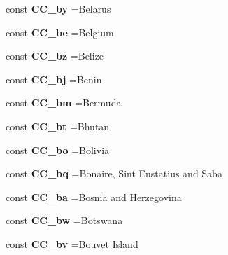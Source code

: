 \begin{DoxyCompactItemize}
const {\bfseries C\+C\+\_\+by} =\textquotesingle{}Belarus\textquotesingle{}
\item 
\hypertarget{class_i_s_o_a37e3e4c86d8a48574833899497b14cec}{}\label{class_i_s_o_a37e3e4c86d8a48574833899497b14cec} 
const {\bfseries C\+C\+\_\+be} =\textquotesingle{}Belgium\textquotesingle{}
\item 
\hypertarget{class_i_s_o_acffaaa157ec8a86e9ac82ad657552a5f}{}\label{class_i_s_o_acffaaa157ec8a86e9ac82ad657552a5f} 
const {\bfseries C\+C\+\_\+bz} =\textquotesingle{}Belize\textquotesingle{}
\item 
\hypertarget{class_i_s_o_aa577cece1733a86a1e013095b94c7e96}{}\label{class_i_s_o_aa577cece1733a86a1e013095b94c7e96} 
const {\bfseries C\+C\+\_\+bj} =\textquotesingle{}Benin\textquotesingle{}
\item 
\hypertarget{class_i_s_o_a4dc1d37b66e0ff75d1a1d0995ffadb3b}{}\label{class_i_s_o_a4dc1d37b66e0ff75d1a1d0995ffadb3b} 
const {\bfseries C\+C\+\_\+bm} =\textquotesingle{}Bermuda\textquotesingle{}
\item 
\hypertarget{class_i_s_o_a5daf301b5d449cbc01c064873382e600}{}\label{class_i_s_o_a5daf301b5d449cbc01c064873382e600} 
const {\bfseries C\+C\+\_\+bt} =\textquotesingle{}Bhutan\textquotesingle{}
\item 
\hypertarget{class_i_s_o_a92393ac5e7aac27c1fd4158d5d0d1832}{}\label{class_i_s_o_a92393ac5e7aac27c1fd4158d5d0d1832} 
const {\bfseries C\+C\+\_\+bo} =\textquotesingle{}Bolivia\textquotesingle{}
\item 
\hypertarget{class_i_s_o_ae092ddfc96ee8c9b41247a7b2e023597}{}\label{class_i_s_o_ae092ddfc96ee8c9b41247a7b2e023597} 
const {\bfseries C\+C\+\_\+bq} =\textquotesingle{}Bonaire, Sint Eustatius and Saba\textquotesingle{}
\item 
\hypertarget{class_i_s_o_a20aa41a46ef319522bad220e6e998db5}{}\label{class_i_s_o_a20aa41a46ef319522bad220e6e998db5} 
const {\bfseries C\+C\+\_\+ba} =\textquotesingle{}Bosnia and Herzegovina\textquotesingle{}
\item 
\hypertarget{class_i_s_o_a75d004663f195bfb2623e58f0e20a083}{}\label{class_i_s_o_a75d004663f195bfb2623e58f0e20a083} 
const {\bfseries C\+C\+\_\+bw} =\textquotesingle{}Botswana\textquotesingle{}
\item 
\hypertarget{class_i_s_o_aea5bf115700b4c0beeccd6eaf441cc4e}{}\label{class_i_s_o_aea5bf115700b4c0beeccd6eaf441cc4e} 
const {\bfseries C\+C\+\_\+bv} =\textquotesingle{}Bouvet Island\textquotesingle{}
\item 
\hypertarget{class_i_s_o_af1b80f3c67c38253181c33648f8f2fd9}{}\label{class_i_s_o_af1b80f3c67c38253181c33648f8f2fd9} 

\end{DoxyCompactItemize}
